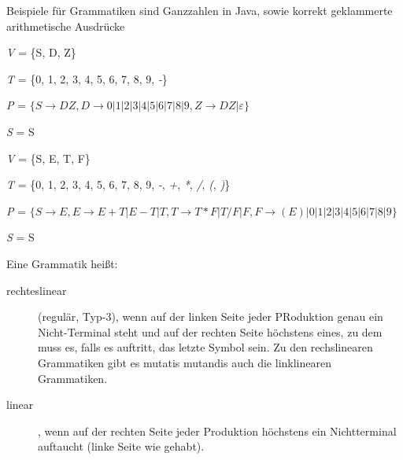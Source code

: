 \documentclass[11pt, a4paper]{article}
\begin{document}
\begin{flushleft}
    Beispiele für Grammatiken sind Ganzzahlen in Java, sowie korrekt geklammerte arithmetische Ausdrücke

    \begin{tcolorbox}[title = Beispiel 1.2, colbacktitle = white, coltitle = black, colframe = black, colback = white, fonttitle = \bfseries]
        \begin{description}
            \item\emph{V} = \{S, D, Z\}

            \item\emph{T} = \{0, 1, 2, 3, 4, 5, 6, 7, 8, 9, \textit{-}\}

            \item\emph{P} = \(\{S \rightarrow DZ, D \rightarrow 0 | 1 | 2 | 3 | 4 | 5 | 6 | 7 | 8 | 9, Z \rightarrow DZ | \varepsilon\}\)

            \item\emph{S} = S
        \end{description}
    \end{tcolorbox}

    \begin{tcolorbox}[title = Beispiel 1.3, colbacktitle = white, coltitle = black, colframe = black, colback = white, fonttitle = \bfseries]
        \begin{description}
            \item\emph{V} = \{S, E, T, F\}

            \item\emph{T} = \{0, 1, 2, 3, 4, 5, 6, 7, 8, 9, \textit{-}, \textit{+}, \textit{*}, \textit{/}, \textit{(}, \textit{)}\}

            \item\emph{P} = \(\{S \rightarrow E, E \rightarrow E + T | E - T | T, T \rightarrow T * F | T / F | F, F \rightarrow (E) | 0 | 1 | 2 | 3 | 4 | 5 | 6 | 7 | 8 | 9\}\)

            \item\emph{S} = S
        \end{description}
    \end{tcolorbox}

    \begin{tcolorbox}[title = Definition 1.6]
        Eine Grammatik heißt:
        \begin{description}

            \item[rechteslinear] (regulär, Typ-3), wenn auf der linken Seite jeder PRoduktion genau ein Nicht-Terminal steht und auf der rechten Seite höchstens eines, zu dem muss es, falls es auftritt, das letzte Symbol sein. \linebreak Zu den rechslinearen Grammatiken gibt es mutatis mutandis auch die linklinearen Grammatiken.
                \item[linear], wenn auf der rechten Seite jeder Produktion höchstens ein Nichtterminal auftaucht (linke Seite wie gehabt).


\end{description}
\end{tcolorbox}
\end{flushleft}
\end{document}
